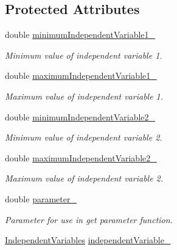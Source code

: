 \subsection*{Protected Attributes}
\begin{DoxyCompactItemize}
\item 
double \hyperlink{classtudat_1_1geometric__shapes_1_1SingleSurfaceGeometry_a47690cfd9b5f3aabfd411f5ac561b153}{minimum\+Independent\+Variable1\+\_\+}
\begin{DoxyCompactList}\small\item\em Minimum value of independent variable 1. \end{DoxyCompactList}\item 
double \hyperlink{classtudat_1_1geometric__shapes_1_1SingleSurfaceGeometry_ad293722bccd5fd354b37d392278272ab}{maximum\+Independent\+Variable1\+\_\+}
\begin{DoxyCompactList}\small\item\em Maximum value of independent variable 1. \end{DoxyCompactList}\item 
double \hyperlink{classtudat_1_1geometric__shapes_1_1SingleSurfaceGeometry_a8bb8a8501f7095d4fc92b04b557c2f13}{minimum\+Independent\+Variable2\+\_\+}
\begin{DoxyCompactList}\small\item\em Minimum value of independent variable 2. \end{DoxyCompactList}\item 
double \hyperlink{classtudat_1_1geometric__shapes_1_1SingleSurfaceGeometry_a351c28e0101e03b52804290ef28c64f5}{maximum\+Independent\+Variable2\+\_\+}
\begin{DoxyCompactList}\small\item\em Maximum value of independent variable 2. \end{DoxyCompactList}\item 
double \hyperlink{classtudat_1_1geometric__shapes_1_1SingleSurfaceGeometry_a801c01c437b48a0066cda10f5f2fc896}{parameter\+\_\+}
\begin{DoxyCompactList}\small\item\em Parameter for use in get parameter function. \end{DoxyCompactList}\item 
\hyperlink{classtudat_1_1geometric__shapes_1_1SingleSurfaceGeometry_a555570aa0102647f40d122b82029fc66}{Independent\+Variables} \hyperlink{classtudat_1_1geometric__shapes_1_1SingleSurfaceGeometry_a8f811cfd5b699c23341a79e271bb3cb2}{independent\+Variable\+\_\+}

\end{DoxyCompactItemize}
